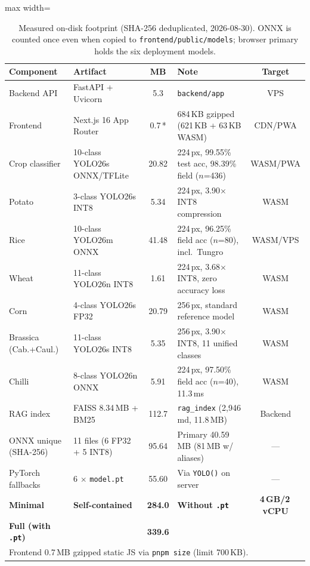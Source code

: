 \begin{table}[t]
\centering
\caption{Measured on-disk footprint (SHA-256 deduplicated, 2026-08-30). ONNX is counted once even when copied to \texttt{frontend/public/models}; browser primary holds the six deployment models.}
\label{tab:deployment_footprint}
\scriptsize
\setlength{\tabcolsep}{2.4pt}
\renewcommand{\arraystretch}{1.08}
\begin{adjustbox}{max width=\textwidth}
\begin{tabular}{p{2.9cm}p{2.9cm}c p{4.9cm}c}
\toprule
\textbf{Component} & \textbf{Artifact} & \textbf{MB} & \textbf{Note} & \textbf{Target} \\
\midrule
Backend API & FastAPI + Uvicorn & 5.3 & \texttt{backend/app} & VPS \\
Frontend & Next.js 16 App Router & 0.7\,* & 684\,KB gzipped (621\,KB + 63\,KB WASM) & CDN/PWA \\
Crop classifier & 10-class YOLO26s ONNX/TFLite & 20.82 & 224\,px, 99.55\% test acc, 98.39\% field ($n$=436) & WASM/PWA \\
Potato & 3-class YOLO26s INT8 & 5.34 & 224\,px, 3.90$\times$ INT8 compression & WASM \\
Rice & 10-class YOLO26m ONNX & 41.48 & 224\,px, 96.25\% field acc ($n$=80), incl.~Tungro & WASM/VPS \\
Wheat & 11-class YOLO26n INT8 & 1.61 & 224\,px, 3.68$\times$ INT8, zero accuracy loss & WASM \\
Corn & 4-class YOLO26s FP32 & 20.79 & 256\,px, standard reference model & WASM \\
Brassica (Cab.+Caul.) & 11-class YOLO26s INT8 & 5.35 & 256\,px, 3.90$\times$ INT8, 11 unified classes & WASM \\
Chilli & 8-class YOLO26n ONNX & 5.91 & 224\,px, 97.50\% field acc ($n$=40), 11.3\,ms & WASM \\
RAG index & FAISS 8.34\,MB + BM25 & 112.7 & \texttt{rag\_index} (2,946 md, 11.8\,MB) & Backend \\
\midrule
ONNX unique (SHA-256) & 11 files (6 FP32 + 5 INT8) & 95.64 & Primary 40.59\,MB (81\,MB w/ aliases) & --- \\
PyTorch fallbacks & 6 $\times$ \texttt{model.pt} & 55.60 & Via \texttt{YOLO()} on server & --- \\
\textbf{Minimal} & \textbf{Self-contained} & \textbf{284.0} & \textbf{Without {\tt .pt}} & \textbf{4\,GB/2\,vCPU} \\
\textbf{Full (with {\tt .pt})} & & \textbf{339.6} & & \\
\bottomrule
\multicolumn{5}{l}{\scriptsize * Frontend 0.7\,MB gzipped static JS via \texttt{pnpm size} (limit 700\,KB).} \\
\end{tabular}
\end{adjustbox}
\end{table}
